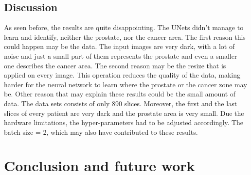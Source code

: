 \documentclass[runningheads,a4paper,11pt]{report}
\begin{document}
\section{Discussion}
\label{section:discussion}

As seen before, the results are quite disappointing. The UNets didn't manage to learn and identify, neither the prostate, nor the cancer area. The first reason this could happen may be the data. The input images are very dark, with a lot of noise and just a small part of them represents the prostate and even a smaller one describes the cancer area. The second reason may be the resize that is applied on every image. This operation reduces the quality of the data, making harder for the neural network to learn where the prostate or the cancer zone may be. Other reason that may explain these results could be the small amount of data. The data sets consists of only 890 slices. Moreover, the first and the last slices of every patient are very dark and the prostate area is very small. Due the hardware limitations, the hyper-parameters had to be adjusted accordingly. The batch size = 2, which may also have contributed to these results.


\chapter{Conclusion and future work}
\label{chapter:concl}
\end{document}
